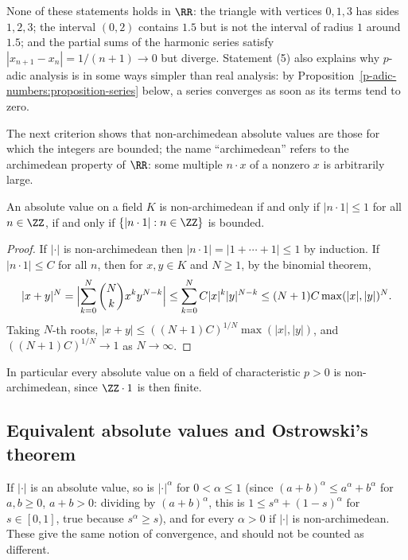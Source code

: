 \begin{counterexample}\label{p-adic-numbers:counterexample-ultrametric-real}
None of these statements holds in $\RR$: the triangle with vertices $0, 1, 3$ has sides $1, 2, 3$; the interval $(0, 2)$ contains $1.5$ but is not the interval of radius $1$ around $1.5$; and the partial
sums of the harmonic series satisfy $|x_{n+1} - x_n| = 1/(n + 1) \to 0$ but diverge. Statement (5) also explains why $p$-adic analysis is in some ways simpler than real analysis: by
Proposition~\ref{p-adic-numbers:proposition-series} below, a series converges as soon as its terms tend to zero.
\end{counterexample}

The next criterion shows that non-archimedean absolute values are those for which the integers are bounded; the name ``archimedean'' refers to the archimedean property of $\RR$: some multiple
$n\cdot x$ of a nonzero $x$ is arbitrarily large.

\begin{proposition}\label{p-adic-numbers:proposition-non-archimedean-criterion}
An absolute value on a field $K$ is non-archimedean if and only if $|n \cdot 1| \leq 1$ for all $n \in \ZZ$, if and only if $\{|n \cdot 1| : n \in \ZZ\}$ is bounded.
\end{proposition}

\begin{proof}
If $|\cdot|$ is non-archimedean then $|n \cdot 1| = |1 + \cdots + 1| \leq 1$ by induction. If $|n \cdot 1| \leq C$ for all $n$, then for $x, y \in K$ and $N \geq 1$, by the binomial theorem,
\[
|x + y|^N = \Bigl|\sum_{k=0}^N\binom Nk x^ky^{N-k}\Bigr| \leq \sum_{k=0}^NC|x|^k|y|^{N-k} \leq (N + 1)C\max(|x|, |y|)^N .
\]
Taking $N$-th roots, $|x + y| \leq ((N + 1)C)^{1/N}\max(|x|, |y|)$, and $((N + 1)C)^{1/N} \to 1$ as $N \to \infty$.
\end{proof}

In particular every absolute value on a field of characteristic $p > 0$ is non-archimedean, since $\ZZ\cdot1$ is then finite.

\subsection{Equivalent absolute values and Ostrowski's theorem}\label{p-adic-numbers:subsection-ostrowski}

If $|\cdot|$ is an absolute value, so is $|\cdot|^\alpha$ for $0 < \alpha \leq 1$ (since $(a + b)^\alpha \leq a^\alpha + b^\alpha$ for $a, b \geq 0$, $a + b > 0$: dividing by $(a + b)^\alpha$, this is $1 \leq s^\alpha + (1 - s)^\alpha$ for $s \in [0, 1]$, true because
$s^\alpha \geq s$), and for every $\alpha > 0$ if $|\cdot|$ is
non-archimedean. These give the same notion of convergence, and should not be counted as different.


